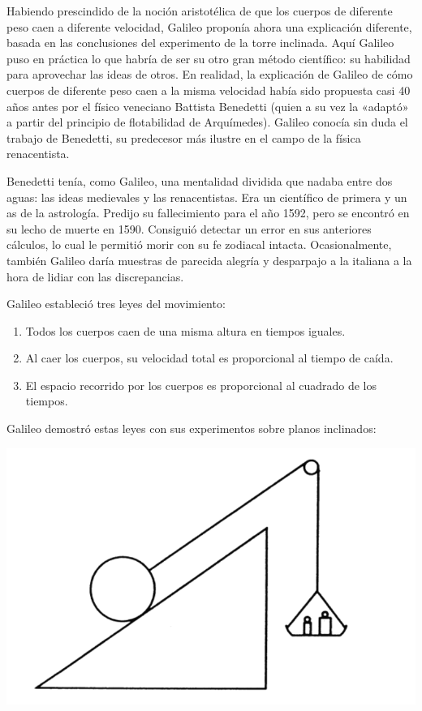 \documentclass[letterpaper, 10pt, journal]{IEEEtran}
\begin{document}
Habiendo prescindido de la noción aristotélica de que los cuerpos de diferente peso caen a diferente velocidad, Galileo proponía ahora una explicación diferente, basada en las conclusiones del experimento de la torre inclinada. Aquí Galileo puso en práctica lo que habría de ser su otro gran método científico: su habilidad para aprovechar las ideas de otros. En realidad, la explicación de Galileo de cómo cuerpos de diferente peso caen a la misma velocidad había sido propuesta casi 40 años antes por el físico veneciano Battista Benedetti (quien a su vez la «adaptó» a partir del principio de flotabilidad de Arquímedes). Galileo conocía sin duda el trabajo de Benedetti, su predecesor más ilustre en el campo de la física renacentista.

Benedetti tenía, como Galileo, una mentalidad dividida que nadaba entre dos aguas: las ideas medievales y las renacentistas. Era un científico de primera y un as de la astrología. Predijo su fallecimiento para el año 1592, pero se encontró en su lecho de muerte en 1590. Consiguió detectar un error en sus anteriores cálculos, lo cual le permitió morir con su fe zodiacal intacta. Ocasionalmente, también Galileo daría muestras de parecida alegría y desparpajo a la italiana a la hora de lidiar con las discrepancias.

Galileo estableció tres leyes del movimiento:
\begin{enumerate}
\item Todos los cuerpos caen de una misma altura en tiempos iguales.
\item Al caer los cuerpos, su velocidad total es proporcional al tiempo de caída.
\item El espacio recorrido por los cuerpos es proporcional al cuadrado de los tiempos.
\end{enumerate}
Galileo demostró estas leyes con sus experimentos sobre planos inclinados:

\includegraphics[scale=0.4]{Galileo1}
\end{document}
